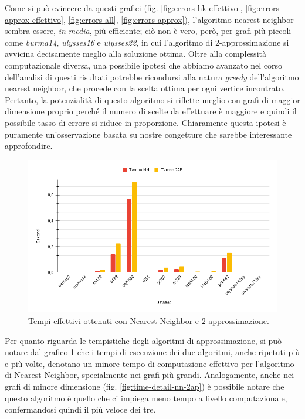 Come si può evincere da questi grafici (fig. \ref{fig:errors-hk-effettivo}, \ref{fig:errors-approx-effettivo}, \ref{fig:errors-all}, \ref{fig:errors-approx}), l'algoritmo nearest neighbor sembra essere, \textit{in media}, più efficiente; ciò non è vero, però, per grafi più piccoli come \textit{burma14}, \textit{ulysses16} e \textit{ulysses22}, in cui l'algoritmo di 2-approssimazione si avvicina decisamente meglio alla soluzione ottima. 
Oltre alla complessità computazionale diversa, una possibile ipotesi che abbiamo avanzato nel corso dell'analisi di questi risultati potrebbe ricondursi alla natura \textit{greedy} dell'algoritmo nearest neighbor, che procede con la scelta ottima per ogni vertice incontrato. Pertanto, la potenzialità di questo algoritmo si riflette meglio con grafi di maggior dimensione proprio perché il numero di scelte da effettuare è maggiore e quindi il possibile tasso di errore si riduce in proporzione. Chiaramente questa ipotesi è puramente un'osservazione basata su nostre congetture che sarebbe interessante approfondire.


\begin{figure}[H]
	\centering
	\includegraphics[width=1\textwidth]{res/images/time/time-nn-2ap.png}
	\caption{Tempi effettivi ottenuti con Nearest Neighbor e 2-approssimazione.}
	\label{fig:time-nn-2ap}
\end{figure}

Per quanto riguarda le tempistiche degli algoritmi di approssimazione, si può notare dal grafico \ref{fig:time-nn-2ap} che i tempi di esecuzione dei due algoritmi, anche ripetuti più e più volte, denotano un minore tempo di computazione effettivo per l'algoritmo di Nearest Neighbor, specialmente nei grafi più grandi. 
Analogamente, anche nei grafi di minore dimensione (fig. \ref{fig:time-detail-nn-2ap}) è possibile notare che questo algoritmo è quello che ci impiega meno tempo a livello computazionale, confermandosi quindi il più veloce dei tre. 


